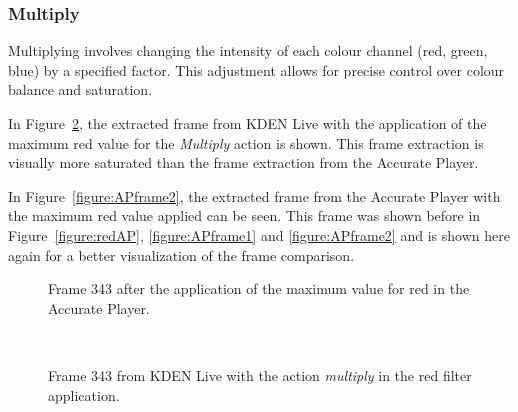 \documentclass[../MasterThesis.tex]{subfiles}
\begin{document}
\subsubsection*{Multiply}

Multiplying involves changing the intensity of each colour channel (red, green, blue) by a specified factor. This adjustment allows for precise control over colour balance and saturation.~\cite{gimp}

In Figure~\ref{figure:multiply}, the extracted frame from KDEN Live with the application of the maximum red value for the \textit{Multiply} action is shown. This frame extraction is visually more saturated than the frame extraction from the Accurate Player.

In Figure~\ref{figure:APframe2}, the extracted frame from the Accurate Player with the maximum red value applied can be seen. This frame was shown before in Figure~\ref{figure:redAP}, \ref{figure:APframe1} and \ref{figure:APframe2} and is shown here again for a better visualization of the frame comparison.


\begin{minipage}{0.48\textwidth}
	\begin{figure}[H]
		\begin{center}
			\caption[Frame 343 after the application of the red filter in the Accurate Player.]{Frame 343 after the application of the maximum value for red in the Accurate Player.}
			\label{figure:APframe3}
		\end{center}
	\end{figure}
\end{minipage}\begin{minipage}{0.04\textwidth}
	\ 
\end{minipage}\begin{minipage}{0.48\textwidth}
	\begin{figure}[H]
		\begin{center}
			\caption[Frame 343 from KDEN Live with the action \textit{multiply}.]{Frame 343 from KDEN Live with the action \textit{multiply} in the red filter application.}
			\label{figure:multiply}
		\end{center}
	\end{figure}
\end{minipage}
\vspace*{1em}
\end{document}
